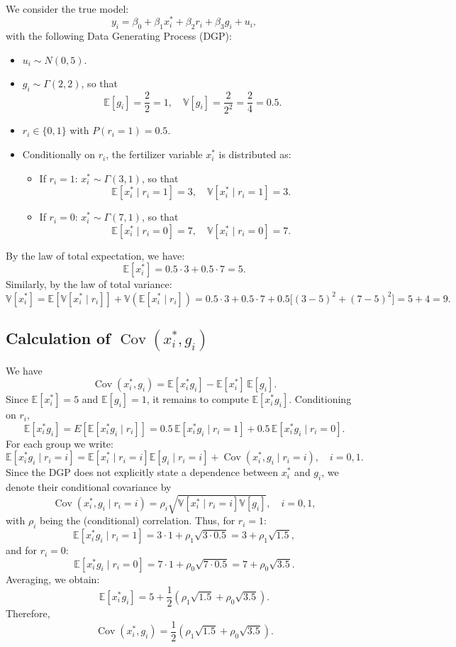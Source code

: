 \documentclass[a4paper,12pt]{article} %
\theoremstyle{nonitalic}
\newenvironment{solution}[1]
  {\renewcommand\theinnercustomsol{#1}\innercustomsol}
  {\endinnercustomsol}
\newcounter{solutionctr}
\renewcommand{\thesolutionctr}{(\alph{solutionctr})}
\newenvironment{autosolution}
  {\stepcounter{solutionctr}\begin{solution}{\thesolutionctr}}
  {\end{solution}}
\begin{document}
\begin{autosolution}
\ 

We consider the true model:
\[
y_i = \beta_0 + \beta_1 x_i^* + \beta_2 r_i + \beta_3 g_i + u_i,
\]
with the following Data Generating Process (DGP):
\begin{itemize}
    \item $u_i \sim N(0,5)$.
    \item $g_i \sim \Gamma(2,2)$, so that 
    \[
    \mathbb{E}[g_i]=\frac{2}{2}=1,\quad \mathbb{V}[g_i]=\frac{2}{2^2}=\frac{2}{4}=0.5.
    \]
    \item $r_i \in \{0,1\}$ with $P(r_i=1)=0.5$.
    \item Conditionally on $r_i$, the fertilizer variable $x_i^*$ is distributed as:
    \begin{itemize}
        \item If $r_i=1$: $x_i^* \sim \Gamma(3,1)$, so that 
        \[
        \mathbb{E}[x_i^*\mid r_i=1]=3,\quad \mathbb{V}[x_i^*\mid r_i=1]=3.
        \]
        \item If $r_i=0$: $x_i^* \sim \Gamma(7,1)$, so that 
        \[
        \mathbb{E}[x_i^*\mid r_i=0]=7,\quad \mathbb{V}[x_i^*\mid r_i=0]=7.
        \]
    \end{itemize}
\end{itemize}

By the law of total expectation, we have:
\[
\mathbb{E}[x_i^*]=0.5\cdot 3+0.5\cdot 7=5.
\]
Similarly, by the law of total variance:
\[
\mathbb{V}[x_i^*]=\mathbb{E}\left[\mathbb{V}[x_i^*\mid r_i]\right]+\mathbb{V}\left(\mathbb{E}[x_i^*\mid r_i]\right)
=0.5\cdot 3+0.5\cdot 7+0.5\Big[(3-5)^2+(7-5)^2\Big]=5+4=9.
\]

\subsection*{Calculation of $\operatorname{Cov}(x_i^*, g_i)$}

We have
\[
\operatorname{Cov}(x_i^*, g_i)=\mathbb{E}[x_i^*g_i]-\mathbb{E}[x_i^*]\,\mathbb{E}[g_i].
\]
Since $\mathbb{E}[x_i^*]=5$ and $\mathbb{E}[g_i]=1$, it remains to compute $\mathbb{E}[x_i^*g_i]$. Conditioning on $r_i$,
\[
\mathbb{E}[x_i^*g_i]=E\left[\mathbb{E}[x_i^*g_i\mid r_i]\right]=0.5\,\mathbb{E}[x_i^*g_i\mid r_i=1]+0.5\,\mathbb{E}[x_i^*g_i\mid r_i=0].
\]
For each group we write:
\[
\mathbb{E}[x_i^*g_i\mid r_i=i]=\mathbb{E}[x_i^*\mid r_i=i]\mathbb{E}[g_i\mid r_i=i]+\operatorname{Cov}(x_i^*,g_i\mid r_i=i),\quad i=0,1.
\]
Since the DGP does not explicitly state a dependence between $x_i^*$ and $g_i$, we denote their conditional covariance by
\[
\operatorname{Cov}(x_i^*,g_i\mid r_i=i)=\rho_i\sqrt{\mathbb{V}[x_i^*\mid r_i=i]\mathbb{V}[g_i]},\quad i=0,1,
\]
with $\rho_i$ being the (conditional) correlation. Thus, for $r_i=1$:
\[
\mathbb{E}[x_i^*g_i\mid r_i=1]=3\cdot 1+\rho_1\sqrt{3\cdot 0.5}=3+\rho_1\sqrt{1.5},
\]
and for $r_i=0$:
\[
\mathbb{E}[x_i^*g_i\mid r_i=0]=7\cdot 1+\rho_0\sqrt{7\cdot 0.5}=7+\rho_0\sqrt{3.5}.
\]
Averaging, we obtain:
\[
\mathbb{E}[x_i^*g_i]=5+\frac{1}{2}\left(\rho_1\sqrt{1.5}+\rho_0\sqrt{3.5}\right).
\]
Therefore,
\[
\operatorname{Cov}(x_i^*, g_i)=\frac{1}{2}\left(\rho_1\sqrt{1.5}+\rho_0\sqrt{3.5}\right).
\]


\end{autosolution}
\end{document}
